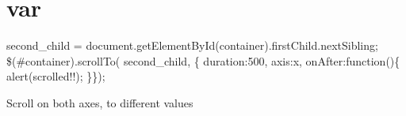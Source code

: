 \hypertarget{var-example}{}\section{var}
second\+\_\+child = document.\+get\+Element\+By\+Id(\textquotesingle{}container\textquotesingle{}).first\+Child.\+next\+Sibling; \$(\textquotesingle{}\#container\textquotesingle{}).scroll\+To( second\+\_\+child, \{ duration\+:500, axis\+:\textquotesingle{}x\textquotesingle{}, on\+After\+:function()\{ alert(\textquotesingle{}scrolled!!\textquotesingle{}); \}\});

Scroll on both axes, to different values


\begin{DoxyCodeInclude}
\end{DoxyCodeInclude}
 